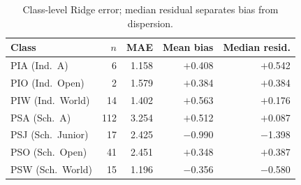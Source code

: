 \begin{table}[t]
\centering
\caption{Class-level Ridge error; median residual separates bias from dispersion.}
\label{tab:holdout-by-class}
\small
\setlength{\tabcolsep}{4pt}
\begin{tabular}{lrrrr}
\toprule
Class & $n$ & MAE & Mean bias & Median resid. \\
\midrule
PIA (Ind.\ A)       &   6 & 1.158 & $+$0.408 & $+$0.542 \\
PIO (Ind.\ Open)    &   2 & 1.579 & $+$0.384 & $+$0.384 \\
PIW (Ind.\ World)   &  14 & 1.402 & $+$0.563 & $+$0.176 \\
PSA (Sch.\ A)       & 112 & 3.254 & $+$0.512 & $+$0.087 \\
PSJ (Sch.\ Junior)  &  17 & 2.425 & $-$0.990 & $-$1.398 \\
PSO (Sch.\ Open)    &  41 & 2.451 & $+$0.348 & $+$0.387 \\
PSW (Sch.\ World)   &  15 & 1.196 & $-$0.356 & $-$0.580 \\
\bottomrule
\end{tabular}
\end{table}

